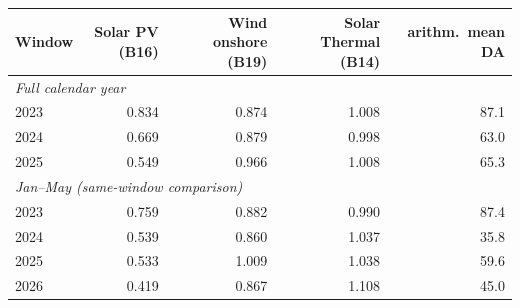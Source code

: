 \begin{tabular}{l r r r r}
\toprule
Window & Solar PV (B16) & Wind onshore (B19) & Solar Thermal (B14) & arithm.\ mean DA \\
\midrule
\multicolumn{5}{l}{\textit{Full calendar year}} \\
2023 & 0.834 & 0.874 & 1.008 & 87.1 \\
2024 & 0.669 & 0.879 & 0.998 & 63.0 \\
2025 & 0.549 & 0.966 & 1.008 & 65.3 \\
\midrule
\multicolumn{5}{l}{\textit{Jan--May (same-window comparison)}} \\
2023 & 0.759 & 0.882 & 0.990 & 87.4 \\
2024 & 0.539 & 0.860 & 1.037 & 35.8 \\
2025 & 0.533 & 1.009 & 1.038 & 59.6 \\
2026 & 0.419 & 0.867 & 1.108 & 45.0 \\
\bottomrule
\end{tabular}
